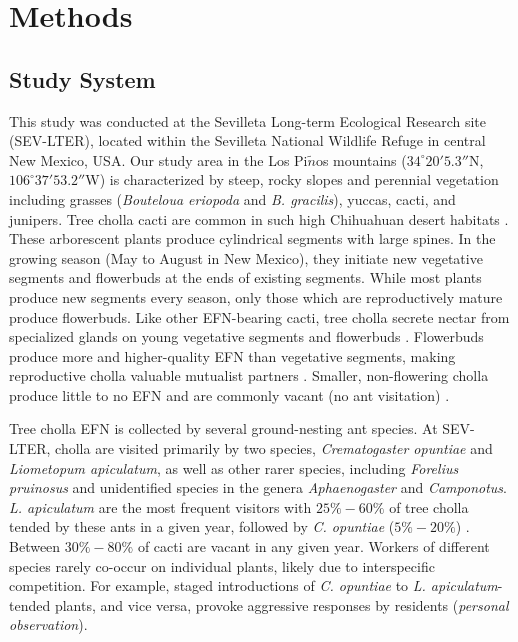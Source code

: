 \documentclass[11pt]{article}
\begin{document}
\section*{Methods}
\subsection*{Study System}
  
This study was conducted at the Sevilleta Long-term Ecological Research site (SEV-LTER), located within the Sevilleta National Wildlife Refuge in central New Mexico, USA.
Our study area in the Los Pi$\tilde{n}$os mountains ($34^\circ20'5.3''$N, $106^\circ37'53.2''$W) is characterized by steep, rocky slopes and perennial vegetation including grasses (\textit{Bouteloua eriopoda} and \textit{B. gracilis}), yuccas, cacti, and junipers. 
Tree cholla cacti are common in such high Chihuahuan desert habitats \citep{Benson1982}. 
These arborescent plants produce cylindrical segments with large spines. 
In the growing season (May to August in New Mexico), they initiate new vegetative segments and flowerbuds at the ends of existing segments. 
While most plants produce new segments every season, only those which are reproductively mature produce flowerbuds. 
Like other EFN-bearing cacti, tree cholla secrete nectar from specialized glands on young vegetative segments and flowerbuds \citep{Ness2006,Oliveira1999}. 
Flowerbuds produce more and higher-quality EFN than vegetative segments, making reproductive cholla valuable mutualist partners \citep{Miller2014}. 
Smaller, non-flowering cholla produce little to no EFN and are commonly vacant (no ant visitation) \citep{Miller2014}. 

Tree cholla EFN is collected by several ground-nesting ant species. 
At SEV-LTER, cholla are visited primarily by two species, \textit{Crematogaster opuntiae} and \textit{Liometopum apiculatum}, as well as other rarer species, including \textit{Forelius pruinosus} and unidentified species in the genera \textit{Aphaenogaster} and \textit{Camponotus}.
\textit{L. apiculatum} are the most frequent visitors with $25\% - 60\%$ of tree cholla tended by these ants in a given year, followed by \textit{C. opuntiae} ($5\% - 20\%$) \citep{Donald2022}. 
Between $ 30\% - 80\%$ of cacti are vacant in any given year. 
Workers of different species rarely co-occur on individual plants, likely due to interspecific competition. 
For example, staged introductions of \textit{C. opuntiae} to \textit{L. apiculatum}-tended plants, and vice versa, provoke aggressive responses by residents (\textit{personal observation}).
\end{document}
